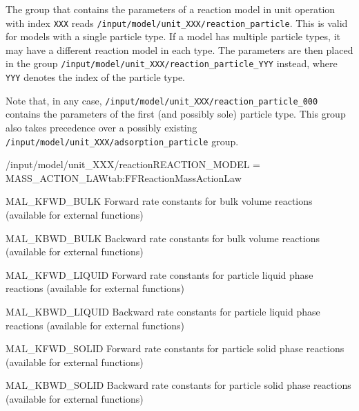 The group that contains the parameters of a reaction model in unit operation with index \texttt{XXX} reads \texttt{/input/model/unit\_XXX/reaction\_particle}.
This is valid for models with a single particle type.
If a model has multiple particle types, it may have a different reaction model in each type.
The parameters are then placed in the group \texttt{/input/model/unit\_XXX/reaction\_particle\_YYY} instead, where \texttt{YYY} denotes the index of the particle type.

Note that, in any case, \texttt{/input/model/unit\_XXX/reaction\_particle\_000} contains the parameters of the first (and possibly sole) particle type.
This group also takes precedence over a possibly existing \texttt{/input/model/unit\_XXX/adsorption\_particle} group.

\begin{condsubgroup}{/input/model/unit\_XXX/reaction}{REACTION\_MODEL = MASS\_ACTION\_LAW}{tab:FFReactionMassActionLaw}
  \begin{dataset}[type=double,range={$\geq 0$},length={\texttt{NREACT}}]{MAL\_KFWD\_BULK}
    Forward rate constants for bulk volume reactions (available for external functions)
  \end{dataset}
  \begin{dataset}[type=double,range={$\geq 0$},length={\texttt{NREACT}}]{MAL\_KBWD\_BULK}
    Backward rate constants for bulk volume reactions (available for external functions)
  \end{dataset}
  \begin{dataset}[type=double,range={$\geq 0$},length={\texttt{NREACT}}]{MAL\_KFWD\_LIQUID}
    Forward rate constants for particle liquid phase reactions (available for external functions)
  \end{dataset}
  \begin{dataset}[type=double,range={$\geq 0$},length={\texttt{NREACT}}]{MAL\_KBWD\_LIQUID}
    Backward rate constants for particle liquid phase reactions (available for external functions)
  \end{dataset}
  \begin{dataset}[type=double,range={$\geq 0$},length={\texttt{NREACT}}]{MAL\_KFWD\_SOLID}
    Forward rate constants for particle solid phase reactions (available for external functions)
  \end{dataset}
  \begin{dataset}[type=double,range={$\geq 0$},length={\texttt{NREACT}}]{MAL\_KBWD\_SOLID}
    Backward rate constants for particle solid phase reactions (available for external functions)

\end{dataset}
\end{condsubgroup}
